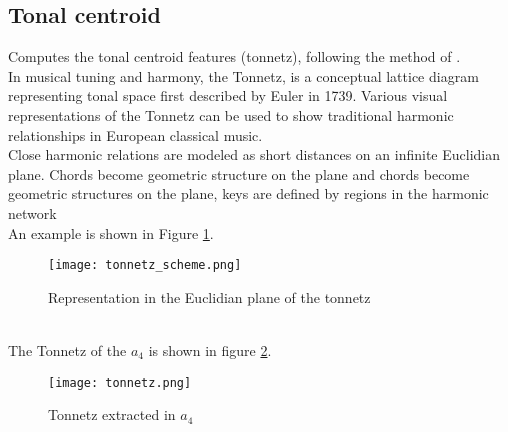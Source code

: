 \subsection{Tonal centroid}
Computes the tonal centroid features (tonnetz), following the method of \cite{harte2006detecting}.
\\
In musical tuning and harmony, the Tonnetz, is a conceptual lattice diagram representing tonal space first described by Euler in 1739. Various visual representations of the Tonnetz can be used to show traditional harmonic relationships in European classical music.
\\
Close harmonic relations are modeled as short distances on an infinite Euclidian plane. Chords become geometric structure on the plane and chords become geometric structures on the plane, keys are defined by regions in the harmonic network
\\
An example is shown in Figure \ref{fig:tonnetz_scheme}.
\begin{figure}[h]
    \centering
    \texttt{[image: tonnetz\_scheme.png]} 
	\caption{Representation in the Euclidian plane of the tonnetz}
    \label{fig:tonnetz_scheme}
\end{figure}
\\
The Tonnetz of the $a_4$ is shown in figure \ref{fig:tonnetz}.
\\
\begin{figure}[h]
    \centering
    \texttt{[image: tonnetz.png]} 
	\caption{Tonnetz extracted in $a_4$}
    \label{fig:tonnetz}
\end{figure}

